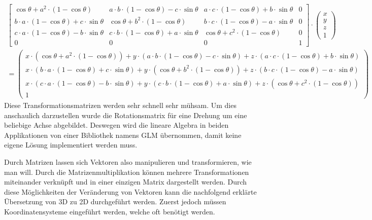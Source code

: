 \documentclass[titlepage, 11pt, a4paper, ngerman]{article}
\begin{document}
\begin{align*}
    \begin{bmatrix} 
    \cos{\theta} + a^{2} \cdot (1 - \cos{\theta}) & a \cdot b \cdot (1 - \cos{\theta}) - c \cdot \sin{\theta} & a \cdot c \cdot (1 - \cos{\theta}) + b \cdot \sin{\theta} & 0 \\
    b \cdot a \cdot (1 - \cos{\theta}) + c \cdot \sin{\theta} & \cos{\theta} + b^{2} \cdot (1 - \cos{\theta}) & b \cdot c \cdot (1 - \cos{\theta}) - a \cdot \sin{\theta} & 0 \\
    c \cdot a \cdot (1 - \cos{\theta}) - b \cdot \sin{\theta} & c \cdot b \cdot (1 - \cos{\theta}) + a \cdot \sin{\theta} & \cos{\theta} + c^{2} \cdot (1 - \cos{\theta}) & 0 \\
    0 & 0 & 0 & 1
    \end{bmatrix} \cdot
    \begin{pmatrix}
    x \\ y \\ z \\ 1
    \end{pmatrix} \\ =
    \begin{pmatrix}
    x \cdot (\cos{\theta} + a^{2} \cdot (1 - \cos{\theta})) + y \cdot (a \cdot b \cdot (1 - \cos{\theta}) - c \cdot \sin{\theta}) + z \cdot (a \cdot c \cdot (1 - \cos{\theta}) + b \cdot \sin{\theta}) \\
    x \cdot (b \cdot a \cdot (1 - \cos{\theta}) + c \cdot \sin{\theta}) + y \cdot (\cos{\theta} + b^{2} \cdot (1 - \cos{\theta})) + z \cdot (b \cdot c \cdot (1 - \cos{\theta}) - a \cdot \sin{\theta}) \\
    x \cdot (c \cdot a \cdot (1 - \cos{\theta}) - b \cdot \sin{\theta}) + y \cdot (c \cdot b \cdot (1 - \cos{\theta}) + a \cdot \sin{\theta}) + z \cdot (\cos{\theta} + c^{2} \cdot (1 - \cos{\theta})) \\
    1
    \end{pmatrix}
\end{align*} 
\bigbreak
Diese Transformationsmatrizen werden sehr schnell sehr mühsam. Um dies anschaulich darzustellen wurde die Rotationsmatrix für eine Drehung um eine beliebige Achse abgebildet. Deswegen wird die lineare Algebra in beiden Applikationen von einer Bibliothek namens \acrfull{GLM} übernommen, damit keine eigene Lösung implementiert werden muss.\par
Durch Matrizen lassen sich Vektoren also manipulieren und transformieren, wie man will. Durch die Matrizenmultiplikation können mehrere Transformationen miteinander verknüpft und in einer einzigen Matrix dargestellt werden. Durch diese Möglichkeiten der Veränderung von Vektoren kann die nachfolgend erklärte Übersetzung von 3D zu 2D durchgeführt werden. Zuerst jedoch müssen Koordinatensysteme eingeführt werden, welche oft benötigt werden.
\end{document}
